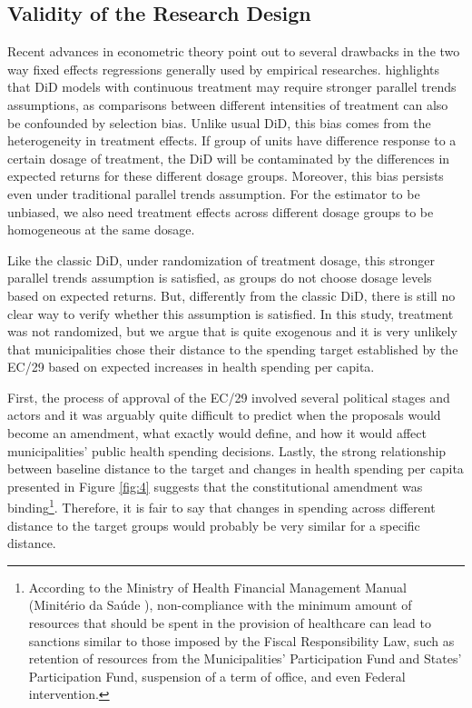 \subsection{Validity of the Research Design}\label{sec:emp_val}

Recent advances in econometric theory point out to several drawbacks in the two way fixed effects regressions generally used by empirical researches. \cite{callaway2021difference} highlights that DiD models with continuous treatment may require stronger parallel trends assumptions, as comparisons between different intensities of treatment can also be confounded by selection bias. Unlike usual DiD, this bias comes from the heterogeneity in treatment effects. If group of units have difference response to a certain dosage of treatment, the DiD will be contaminated by the differences in expected returns for these different dosage groups. Moreover, this bias persists even under traditional parallel trends assumption. For the estimator to be unbiased, we also need treatment effects across different dosage groups to be homogeneous at the same dosage. 

Like the classic DiD, under randomization of treatment dosage, this stronger parallel trends assumption is satisfied, as groups do not choose dosage levels based on expected returns. But, differently from the classic DiD, there is still no clear way to verify whether this assumption is satisfied. In this study, treatment was not randomized, but we argue that is quite exogenous and it is very unlikely that municipalities chose their distance to the spending target established by the EC/29 based on expected increases in health spending per capita. 

First, the process of approval of the EC/29 involved several political stages and actors and it was arguably quite difficult to predict when the proposals would become an amendment, what exactly would define, and how it would affect municipalities' public health spending decisions. Lastly, the strong relationship between baseline distance to the target and changes in health spending per capita presented in Figure \ref{fig:4} suggests that the constitutional amendment was binding\footnote{According to the Ministry of Health Financial Management Manual (Minitério da Saúde \citeyear{msmanual}), non-compliance with the minimum amount of resources that should be spent in the provision of healthcare can lead to sanctions similar to those imposed by the Fiscal Responsibility Law, such as retention of resources from the Municipalities’ Participation Fund and States’ Participation Fund, suspension of a term of office, and even Federal intervention.}. Therefore, it is fair to say that changes in spending across different distance to the target groups would probably be very similar for a specific distance.

